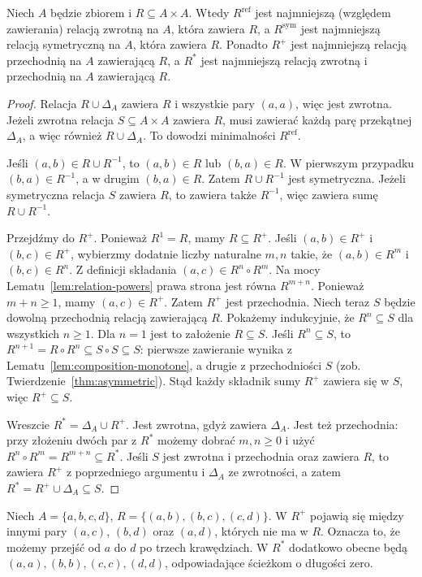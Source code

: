 \begin{twierdzenie}\label{thm:relation-closure}
Niech $A$ będzie zbiorem i $R\subseteq A\times A$.
Wtedy $R^{\mathrm{ref}}$ jest najmniejszą (względem zawierania)
relacją zwrotną na $A$, która zawiera $R$,
a $R^{\mathrm{sym}}$ jest najmniejszą relacją symetryczną
na $A$, która zawiera $R$. Ponadto $R^+$ jest najmniejszą
relacją przechodnią na $A$ zawierającą $R$,
a $R^*$ jest najmniejszą relacją zwrotną i przechodnią
na $A$ zawierającą $R$.
\end{twierdzenie}
\begin{proof}
Relacja $R\cup\Delta_A$ zawiera $R$ i wszystkie pary
$(a,a)$, więc jest zwrotna. Jeżeli zwrotna relacja
$S\subseteq A\times A$ zawiera $R$, musi zawierać
każdą parę przekątnej $\Delta_A$, a więc również
$R\cup\Delta_A$. To dowodzi minimalności
$R^{\mathrm{ref}}$.

Jeśli $(a,b)\in R\cup R^{-1}$, to
$(a,b)\in R$ lub $(b,a)\in R$. W pierwszym przypadku
$(b,a)\in R^{-1}$, a w drugim $(b,a)\in R$.
Zatem $R\cup R^{-1}$ jest symetryczna. Jeżeli symetryczna
relacja $S$ zawiera $R$, to zawiera także $R^{-1}$,
więc zawiera sumę $R\cup R^{-1}$.

Przejdźmy do $R^+$. Ponieważ $R^1=R$, mamy
$R\subseteq R^+$. Jeśli $(a,b)\in R^+$ i $(b,c)\in R^+$,
wybierzmy dodatnie liczby naturalne $m,n$ takie, że
$(a,b)\in R^m$ i $(b,c)\in R^n$.
Z definicji składania $(a,c)\in R^n\circ R^m$.
Na mocy Lematu~\ref{lem:relation-powers} prawa strona
jest równa $R^{m+n}$. Ponieważ $m+n\ge1$,
mamy $(a,c)\in R^+$. Zatem $R^+$ jest przechodnia.
Niech teraz $S$ będzie dowolną przechodnią relacją
zawierającą $R$. Pokażemy indukcyjnie, że
$R^n\subseteq S$ dla wszystkich $n\ge1$.
Dla $n=1$ jest to założenie $R\subseteq S$.
Jeśli $R^n\subseteq S$, to
$R^{n+1}=R\circ R^n\subseteq S\circ S\subseteq S$:
pierwsze zawieranie wynika z Lematu~\ref{lem:composition-monotone},
a drugie z przechodniości $S$ (zob.
Twierdzenie~\ref{thm:asymmetric}).
Stąd każdy składnik sumy $R^+$ zawiera się w $S$,
więc $R^+\subseteq S$.

Wreszcie $R^*=\Delta_A\cup R^+$.
Jest zwrotna, gdyż zawiera $\Delta_A$.
Jest też przechodnia: przy złożeniu dwóch par z
$R^*$ możemy dobrać $m,n\ge0$ i użyć
$R^n\circ R^m=R^{m+n}\subseteq R^*$.
Jeśli $S$ jest zwrotna i przechodnia oraz zawiera $R$,
to zawiera $R^+$ z poprzedniego argumentu i
$\Delta_A$ ze zwrotności, a zatem
$R^*=R^+\cup\Delta_A\subseteq S$.
\end{proof}

\begin{przyklad}
Niech $A=\{a,b,c,d\}$, $R=\{(a,b),(b,c),(c,d)\}$.
W $R^+$ pojawią się między innymi pary $(a,c)$,
$(b,d)$ oraz $(a,d)$, których nie ma w $R$.
Oznacza to, że możemy przejść od $a$ do $d$ po trzech
krawędziach. W $R^*$ dodatkowo obecne będą
$(a,a),(b,b),(c,c),(d,d)$, odpowiadające ścieżkom
o długości zero.
\end{przyklad}

